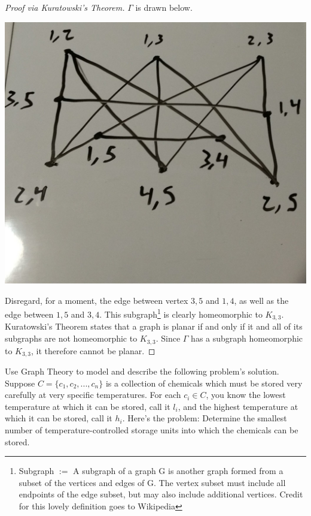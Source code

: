 \documentclass[12pt]{article}
\newenvironment{problem}[2][Problem]{\begin{trivlist}
\item[\hskip \labelsep {\bfseries #1}\hskip \labelsep {\bfseries #2.}]}{\end{trivlist}}
\begin{document}
\begin{proof}[Proof via Kuratowski's Theorem]
$\Gamma$ is drawn below. 
\begin{center}
\includegraphics[scale=0.1]{Gamma.jpg}
\end{center}
Disregard, for a moment, the edge between vertex $3,5$ and $1,4$, as well as the edge between $1,5$ and $3,4$. This subgraph\footnote{Subgraph $:=$ A subgraph of a graph G is another graph formed from a subset of the vertices and edges of G. The vertex subset must include all endpoints of the edge subset, but may also include additional vertices. Credit for this lovely definition goes to Wikipedia} is clearly homeomorphic to $K_{3,3}$. Kuratowski's Theorem states that a graph is planar if and only if it and all of its subgraphs are not homeomorphic to $K_{3,3}$. Since $\Gamma$ has a subgraph homeomorphic to $K_{3,3}$, it therefore cannot be planar.
\end{proof}

\begin{problem}{3}
Use Graph Theory to model and describe the following problem's solution. Suppose $C=\{c_1,c_2,...,c_n\}$ is a collection of chemicals which must be stored very carefully at very specific temperatures. For each $c_i \in C$, you know the lowest temperature at which it can be stored, call it $l_i$, and the highest temperature at which it can be stored, call it $h_i$. Here's the problem: Determine the smallest number of temperature-controlled storage units into which the chemicals can be stored.
\end{problem}
 
\end{document}
